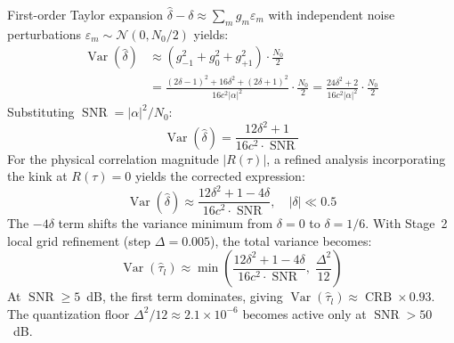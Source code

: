 \documentclass[journal]{IEEEtran}
\DeclareMathOperator{\Var}{Var}
\DeclareMathOperator{\SNR}{SNR}
\DeclareMathOperator{\CRB}{CRB}
\newcommand{\Nc}{\mathcal{N}}
\begin{document}
First-order Taylor expansion $\hat{\delta} - \delta \approx \sum_m g_m \varepsilon_m$ with independent noise perturbations $\varepsilon_m \sim \Nc(0, N_0/2)$ yields:
\begin{align}
\Var(\hat{\delta}) &\approx (g_{-1}^2 + g_0^2 + g_{+1}^2) \cdot \frac{N_0}{2} \nonumber\\
&= \frac{(2\delta-1)^2 + 16\delta^2 + (2\delta+1)^2}{16c^2|\alpha|^2} \cdot \frac{N_0}{2}
   = \frac{24\delta^2 + 2}{16c^2|\alpha|^2} \cdot \frac{N_0}{2}
\label{eq:A6}
\end{align}
Substituting $\SNR = |\alpha|^2/N_0$:
\begin{equation}
\Var(\hat{\delta}) = \frac{12\delta^2 + 1}{16c^2 \cdot \SNR}
\label{eq:A7}
\end{equation}
For the physical correlation magnitude $|R(\tau)|$, a refined analysis incorporating the kink at $R(\tau) = 0$ yields the corrected expression:
\begin{equation}
\Var(\hat{\delta}) \approx \frac{12\delta^2 + 1 - 4\delta}{16c^2 \cdot \SNR}, \quad |\delta| \ll 0.5
\label{eq:A8}
\end{equation}
The $-4\delta$ term shifts the variance minimum from $\delta = 0$ to $\delta = 1/6$. With Stage~2 local grid refinement (step $\Delta = 0.005$), the total variance becomes:
\begin{equation}
\Var(\hat{\tau}_l) \approx \min\!\left( \frac{12\delta^2 + 1 - 4\delta}{16c^2 \cdot \SNR}, \; \frac{\Delta^2}{12} \right)
\label{eq:A9}
\end{equation}
At $\SNR \ge 5$~dB, the first term dominates, giving $\Var(\hat{\tau}_l) \approx \CRB \times 0.93$. The quantization floor $\Delta^2/12 \approx 2.1 \times 10^{-6}$ becomes active only at $\SNR > 50$~dB.
\end{document}
